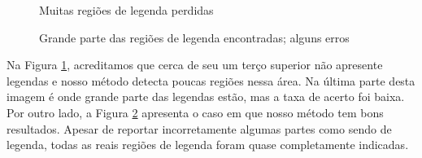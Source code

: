 \documentclass[12pt]{article}
\begin{document}
\begin{figure}[h!]
  \centering
  \quad
  \caption{Muitas regiões de legenda perdidas\label{lowcontrast}}
\end{figure}

\begin{figure}[h!]
  \centering
  \quad
  \caption{Grande parte das regiões de legenda encontradas; alguns
    erros\label{highcontrast}}
\end{figure}

Na  Figura \ref{lowcontrast}, acreditamos  que cerca  de seu  um terço
superior não apresente legendas  e nosso método detecta poucas regiões
nessa  área.  %
Na última parte  desta imagem é onde grande  parte das legendas estão,
mas  a  taxa   de  acerto  foi  baixa.   Por   outro  lado,  a  Figura
\ref{highcontrast}  apresenta o  caso  em que  nosso  método tem  bons
resultados.   Apesar de  reportar incorretamente  algumas  partes como
sendo  de legenda,  todas  as  reais regiões  de  legenda foram  quase
completamente indicadas.
\end{document}
